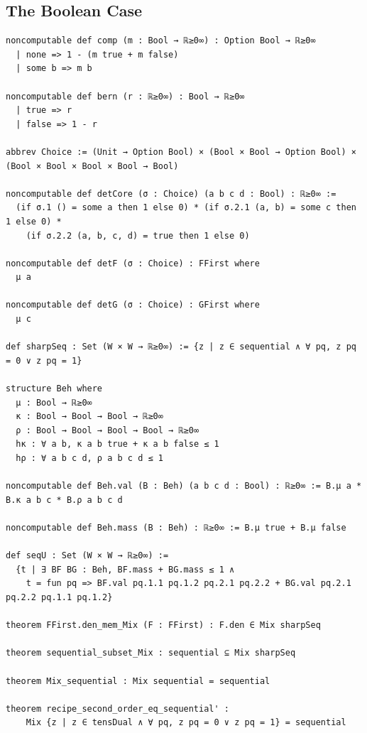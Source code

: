 \subsection{The Boolean Case}

\label{lean:kuhn-bool}
\begin{lstlisting}
noncomputable def comp (m : Bool → ℝ≥0∞) : Option Bool → ℝ≥0∞
  | none => 1 - (m true + m false)
  | some b => m b

noncomputable def bern (r : ℝ≥0∞) : Bool → ℝ≥0∞
  | true => r
  | false => 1 - r

abbrev Choice := (Unit → Option Bool) × (Bool × Bool → Option Bool) × (Bool × Bool × Bool × Bool → Bool)

noncomputable def detCore (σ : Choice) (a b c d : Bool) : ℝ≥0∞ :=
  (if σ.1 () = some a then 1 else 0) * (if σ.2.1 (a, b) = some c then 1 else 0) *
    (if σ.2.2 (a, b, c, d) = true then 1 else 0)

noncomputable def detF (σ : Choice) : FFirst where
  μ a

noncomputable def detG (σ : Choice) : GFirst where
  μ c

def sharpSeq : Set (W × W → ℝ≥0∞) := {z | z ∈ sequential ∧ ∀ pq, z pq = 0 ∨ z pq = 1}

structure Beh where
  μ : Bool → ℝ≥0∞
  κ : Bool → Bool → Bool → ℝ≥0∞
  ρ : Bool → Bool → Bool → Bool → ℝ≥0∞
  hκ : ∀ a b, κ a b true + κ a b false ≤ 1
  hρ : ∀ a b c d, ρ a b c d ≤ 1

noncomputable def Beh.val (B : Beh) (a b c d : Bool) : ℝ≥0∞ := B.μ a * B.κ a b c * B.ρ a b c d

noncomputable def Beh.mass (B : Beh) : ℝ≥0∞ := B.μ true + B.μ false

def seqU : Set (W × W → ℝ≥0∞) :=
  {t | ∃ BF BG : Beh, BF.mass + BG.mass ≤ 1 ∧
    t = fun pq => BF.val pq.1.1 pq.1.2 pq.2.1 pq.2.2 + BG.val pq.2.1 pq.2.2 pq.1.1 pq.1.2}

theorem FFirst.den_mem_Mix (F : FFirst) : F.den ∈ Mix sharpSeq

theorem sequential_subset_Mix : sequential ⊆ Mix sharpSeq

theorem Mix_sequential : Mix sequential = sequential

theorem recipe_second_order_eq_sequential' :
    Mix {z | z ∈ tensDual ∧ ∀ pq, z pq = 0 ∨ z pq = 1} = sequential
\end{lstlisting}

